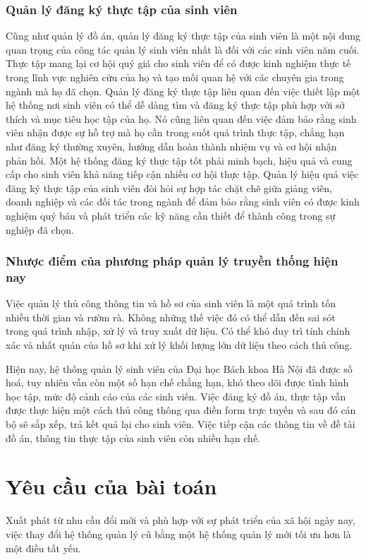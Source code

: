 \subsubsection*{Quản lý đăng ký thực tập của sinh viên}
	Cũng như quản lý đồ án, quản lý đăng ký thực tập của sinh viên là một nội dung quan trọng của công tác quản lý sinh viên nhất là đối với các sinh viên năm cuối.
	Thực tập mang lại cơ hội quý giá cho sinh viên để có được kinh nghiệm thực tế trong lĩnh vực nghiên cứu của họ và tạo mối quan hệ với các chuyên gia trong ngành mà họ đã chọn.
	Quản lý đăng ký thực tập liên quan đến việc thiết lập một hệ thống nơi sinh viên có thể dễ dàng tìm và đăng ký thực tập phù hợp với sở thích và mục tiêu học tập của họ.
	Nó cũng liên quan đến việc đảm bảo rằng sinh viên nhận được sự hỗ trợ mà họ cần trong suốt quá trình thực tập, chẳng hạn như đăng ký thường xuyên, hướng dẫn hoàn thành nhiệm vụ và cơ hội nhận phản hồi.
	Một hệ thống đăng ký thực tập tốt phải minh bạch, hiệu quả và cung cấp cho sinh viên khả năng tiếp cận nhiều cơ hội thực tập.
	Quản lý hiệu quả việc đăng ký thực tập của sinh viên đòi hỏi sự hợp tác chặt chẽ giữa giảng viên, doanh nghiệp và các đối tác trong ngành để đảm bảo rằng sinh viên có được kinh nghiệm quý báu và phát triển các kỹ năng cần thiết để thành công trong sự nghiệp đã chọn.

\subsubsection*{Nhược điểm của phương pháp quản lý truyền thống hiện nay}
	Việc quản lý thủ công thông tin và hồ sơ của sinh viên là một quá trình tốn nhiều thời gian và rườm rà. 
	Không những thế việc đó có thể dẫn đến sai sót trong quá trình nhập, xử lý và truy xuất dữ liệu.
	Có thể khó duy trì tính chính xác và nhất quán của hồ sơ khi xử lý khối lượng lớn dữ liệu theo cách thủ công.

	Hiện nay, hệ thống quản lý sinh viên của Đại học Bách khoa Hà Nội đã được số hoá, tuy nhiên vẫn còn một số hạn chế chẳng hạn, 
	khó theo dõi được tình hình học tập, mức độ cảnh cáo của các sinh viên.
	Việc đăng ký đồ án, thực tập vẫn được thực hiện một cách thủ công thông qua điền form trực tuyến và sau đó cán bộ sẽ sắp xếp, trả kết quả lại cho sinh viên.
	Việc tiếp cận các thông tin về đề tài đồ án, thông tin thực tập của sinh viên còn nhiều hạn chế.

\section{Yêu cầu của bài toán}
Xuất phát từ nhu cầu đổi mới và phù hợp với sự phát triển của xã hội ngày nay, việc thay đổi hệ thống quản lý cũ bằng một hệ thống quản lý mới tối ưu hơn là một điều tất yếu.

